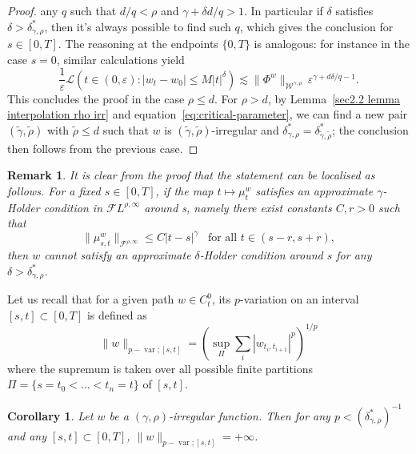 \documentclass[10pt]{article}
\newcommand{\comma}{{,}}
\newcommand{\tmop}[1]{\ensuremath{\operatorname{#1}}}
\newtheorem{corollary}[theorem]{Corollary}
\newtheorem{remark}[theorem]{Remark}
\begin{document}
\begin{proof}
  any $q$ such that $d / q < \rho$ and $\gamma + \delta d / q > 1$. In
  particular if $\delta$ satisfies $\delta > \delta^{\ast}_{\gamma, \rho}$,
  then it's always possible to find such $q$, which gives the conclusion for
  $s \in [0, T]$. The reasoning at the endpoints $\{ 0, T \}$ is analogous:
  for instance in the case $s = 0$, similar calculations yield
  \[ \frac{1}{\varepsilon} \mathcal{L} (t \in (0, \varepsilon) : | w_t - w_0 |
     \leqslant M | t |^{\delta}) \lesssim \| \Phi^w \|_{\mathcal{W}^{\gamma
     \comma \rho}} \, \varepsilon^{\gamma + d \delta / q - 1} . \]
  This concludes the proof in the case $\rho \leqslant d$. For $\rho > d$, by
  Lemma~\ref{sec2.2 lemma interpolation rho irr} and
  equation~\eqref{eq:critical-parameter}, we can find a new pair
  $(\tilde{\gamma}, \tilde{\rho})$ with $\tilde{\rho} \leqslant d$ such that
  $w$ is $(\tilde{\gamma}, \tilde{\rho})$-irregular and $\delta_{\gamma,
  \rho}^{\ast} = \delta_{\tilde{\gamma}, \tilde{\rho}}^{\ast}$; the conclusion
  then follows from the previous case.
\end{proof}

\begin{remark}
  It is clear from the proof that the statement can be localised as follows.
  For a fixed $s \in [0, T]$, if the map $t \mapsto \mu^w_t$ satisfies an
  approximate $\gamma$-Holder condition in $\mathcal{F} L^{\rho, \infty}$
  around s, namely there exist constants $C, r > 0$ such that
  \[ \| \mu^w_{s, t} \|_{\mathcal{F}^{\rho, \infty}} \leqslant C | t - s
     |^{\gamma}  \enspace \text{ for all } t \in (s - r, s + r), \]
  then $w$ cannot satisfy an approximate $\delta$-Holder condition around $s$
  for any $\delta > \delta^{\ast}_{\gamma, \rho}$.
\end{remark}

Let us recall that for a given path $w \in C^0_t$, its $p$-variation on an
interval $[s, t] \subset [0, T]$ is defined as
\[ \| w \|_{p - \tmop{var} ; [s, t]} = \left( \sup_{\Pi} \sum_i | w_{t_i, t_{i
   + 1}} |^p \right)^{1 / p} \]
where the supremum is taken over all possible finite partitions $\Pi = \{ s =
t_0 < \ldots < t_n = t \}$ of $[s, t]$.

\begin{corollary}
  \label{cor:p-variation}Let $w$ be a $(\gamma, \rho)$-irregular function.
  Then for any $p < (\delta^{\ast}_{\gamma, \rho})^{- 1}$ and any $[s, t]
  \subset [0, T]$, $\| w \|_{p - \tmop{var} ; [s, t]} = + \infty$.
\end{corollary}
\end{document}
